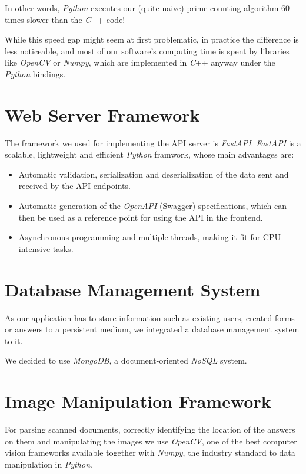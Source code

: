 \documentclass[11pt, a4paper]{report}
\begin{document}
In other words, \textit{Python} executes our (quite naive) prime counting algorithm $60$ times slower than the \textit{C}++ code!

While this speed gap might seem at first problematic, in practice the difference is less noticeable, and most of our software's computing time is spent by libraries like \textit{OpenCV} or \textit{Numpy}, which are implemented in \textit{C}++ anyway under the \textit{Python} bindings.

\section{Web Server Framework}

The framework we used for implementing the API server is \textit{FastAPI}. \textit{FastAPI} is a scalable, lightweight and efficient \textit{Python} framwork, whose main advantages are:
\begin{itemize}
    \item Automatic validation, serialization and deserialization of the data sent and received by the API endpoints.
    \item Automatic generation of the \textit{OpenAPI} (Swagger) specifications, which can then be used as a reference point for using the API in the frontend.
    \item Asynchronous programming and multiple threads, making it fit for CPU-intensive tasks.
\end{itemize}

\section{Database Management System}

As our application has to store information such as existing users, created forms or answers to a persistent medium, we integrated a database management system to it.

We decided to use \textit{MongoDB}, a document-oriented \textit{NoSQL} system.

\section{Image Manipulation Framework}

For parsing scanned documents, correctly identifying the location of the answers on them and manipulating the images we use \textit{OpenCV}, one of the best computer vision frameworks available together with \textit{Numpy}, the industry standard to data manipulation in \textit{Python}.
\end{document}
